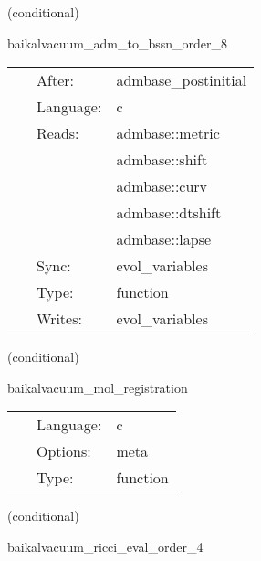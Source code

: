 \vspace{5mm}

   (conditional) 

\hspace{5mm} baikalvacuum\_adm\_to\_bssn\_order\_8 

\hspace{5mm}{\it convert initial data into bssn variables } 


\hspace{5mm}

 \begin{tabular*}{160mm}{cll} 
~ & After:  & admbase\_postinitial \\ 
~ & Language:  & c \\ 
~ & Reads:  & admbase::metric \\ 
~& ~ &admbase::shift\\ 
~& ~ &admbase::curv\\ 
~& ~ &admbase::dtshift\\ 
~& ~ &admbase::lapse\\ 
~ & Sync:  & evol\_variables \\ 
~ & Type:  & function \\ 
~ & Writes:  & evol\_variables \\ 
\end{tabular*} 


\vspace{5mm}

   (conditional) 

\hspace{5mm} baikalvacuum\_mol\_registration 

\hspace{5mm}{\it register variables for mol } 


\hspace{5mm}

 \begin{tabular*}{160mm}{cll} 
~ & Language:  & c \\ 
~ & Options:  & meta \\ 
~ & Type:  & function \\ 
\end{tabular*} 


\vspace{5mm}

   (conditional) 

\hspace{5mm} baikalvacuum\_ricci\_eval\_order\_4 

